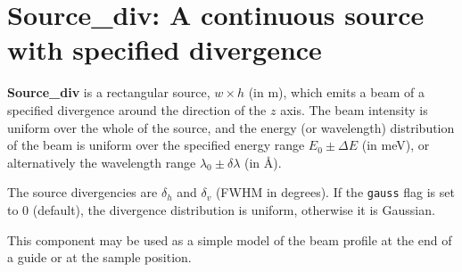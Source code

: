 \section{Source\_div: A continuous source with specified divergence}
\label{source-div}


{\bf Source\_div} is a rectangular source, $w \times h$ (in m), which emits a
beam of a specified divergence around the direction of the $z$ axis.
The beam intensity is uniform over
the whole of the source, and the energy (or wavelength) distribution
of the beam is uniform over the specified energy range
$E_0 \pm \Delta E$ (in meV), or alternatively
the wavelength range $\lambda_0 \pm \delta\lambda$ (in \AA ).

The source divergencies are $\delta_h$ and $\delta_v$ (FWHM in degrees).
If the \verb+gauss+ flag is set to 0 (default),
the divergence distribution is uniform, otherwise it is Gaussian.

This component may be used as a simple model of the
beam profile at the end of a guide or at the sample position.

